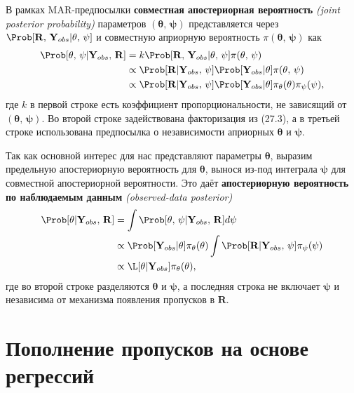 В рамках MAR-предпосылки {\bf совместная апостериорная вероятность} \emph{(joint posterior probability)} параметров $(\mathbf{\theta}, \, \mathbf{\psi})$ представляется через $\Prob[\mathbf{R}, \, \mathbf{Y}_{obs}|\mathbf{\theta}, \, \mathbf{\psi}]$ и совместную априорную вероятность $\pi (\mathbf{\theta}, \, \mathbf{\psi})$ как
\begin{align}
\Prob[\mathbf{\theta}, \, \mathbf{\psi}|\mathbf{Y}_{obs}, \, \mathbf{R}] &= k \Prob[\mathbf{R}, \, \mathbf{Y}_{obs}|\mathbf{\theta}, \, \mathbf{\psi}] \pi (\mathbf{\theta}, \, \mathbf{\psi}) \\
&\propto \Prob[\mathbf{R}|\mathbf{Y}_{obs}, \, \mathbf{\psi}] \Prob[\mathbf{Y}_{obs}|\mathbf{\theta}]\pi (\mathbf{\theta}, \, \mathbf{\psi}) \notag \\
&\propto \Prob[\mathbf{R}|\mathbf{Y}_{obs}, \, \mathbf{\psi}] \Prob[\mathbf{Y}_{obs}|\mathbf{\theta}]\pi_{\theta} (\mathbf{\theta})\pi_{\psi} (\mathbf{\psi}), \notag
\end{align}
где $k$ в первой строке есть коэффициент пропорциональности, не зависящий от $(\mathbf{\theta}, \, \mathbf{\psi})$. Во второй строке задействована факторизация из (27.3), а в третьей строке использована предпосылка о независимости априорных $\mathbf{\theta}$ и $\mathbf{\psi}$.

Так как основной интерес для нас представляют параметры $\mathbf{\theta}$, выразим предельную апостериорную вероятность для $\mathbf{\theta}$, вынося из-под интеграла $\mathbf{\psi}$ для совместной апостериорной вероятности. Это даёт {\bf апостериорную вероятность по наблюдаемым данным} \emph{(observed-data posterior)}
\begin{align}
\Prob[\mathbf{\theta}|\mathbf{Y}_{obs}, \, \mathbf{R}] &= \int \Prob[\mathbf{\theta}, \, \mathbf{\psi}|\mathbf{Y}_{obs}, \, \mathbf{R}]d\mathbf{\psi} \\
&\propto \Prob[\mathbf{Y}_{obs}|\mathbf{\theta}]\pi_{\theta} (\mathbf{\theta}) \int \Prob[\mathbf{R}|\mathbf{Y}_{obs}, \, \mathbf{\psi}]\pi_{\psi} (\mathbf{\psi}) \notag \\
&\propto \L [\mathbf{\theta}|\mathbf{Y}_{obs}]\pi_{\theta} (\mathbf{\theta}), \notag 
\end{align}
где во второй строке разделяются $\mathbf{\theta}$ и $\mathbf{\psi}$, а последняя строка не включает $\mathbf{\psi}$ и независима от механизма появления пропусков в $\mathbf{R}$.

\section{Пополнение пропусков на основе регрессий} 


